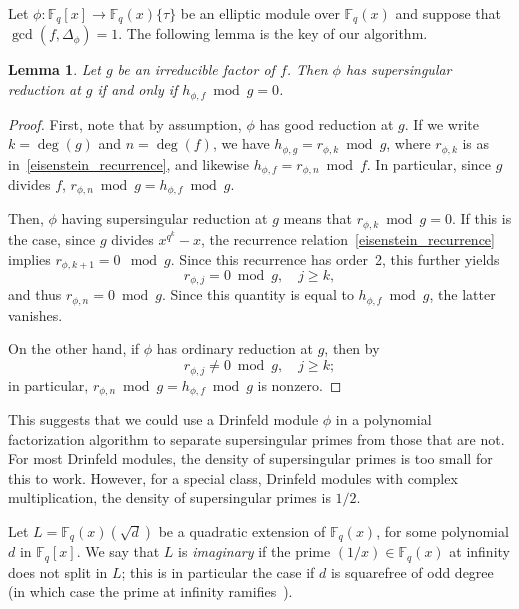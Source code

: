 \documentclass[12pt]{article}
\theoremstyle{plain}
\newtheorem{lemma}[theorem]{Lemma}
\theoremstyle{definition}
\newcommand{\ang}[1]{\{#1\}}
\def\F{\ensuremath{\mathbb{F}}}
\begin{document}
Let $\phi: \F_q[x] \to \F_q(x)\ang{\tau}$ be an elliptic
module over $\F_q(x)$ and suppose that $\gcd(f,\Delta_\phi)=1$. 
 The following lemma is the key of our algorithm.
\begin{lemma}\label{lemma:split}
  Let $g$ be an irreducible factor of $f$. Then $\phi$ has supersingular
  reduction at $g$ if and only if $h_{\phi,f} \bmod g=0$.
\end{lemma}
\begin{proof}
  First, note that by assumption, $\phi$ has good reduction at $g$. If
  we write $k=\deg(g)$ and $n=\deg(f)$, we have $h_{\phi,g}=r_{\phi,k}
  \bmod g$, where $r_{\phi,k}$ is as in~\eqref{eisenstein_recurrence},
  and likewise $h_{\phi,f} = r_{\phi,n} \bmod f$. In particular,
  since $g$ divides $f$, $r_{\phi,n} \bmod g = h_{\phi,f} \bmod g$. 

  Then, $\phi$ having supersingular reduction at $g$ means that
  $r_{\phi,k} \bmod g=0$. If this is the case, since $g$ divides
  $x^{q^k}-x$, the recurrence relation~\eqref{eisenstein_recurrence} implies $r_{\phi,k+1} = 0 \mod
  g$. Since this recurrence has order~2, this further yields
  \begin{equation}\label{supersingular_zero}
    r_{\phi,j} = 0 \bmod g,\quad j \geq k,
  \end{equation}
  and thus $r_{\phi,n}=0 \bmod g$. Since this quantity is equal to
  $h_{\phi,f}\bmod g$, the latter vanishes.

  On the other hand, if $\phi$ has ordinary reduction at $g$, then
  by~\cite[Lemma~2.3]{cor}
  \begin{equation}\label{supersingular_nonzero}
    r_{\phi,j} \neq 0 \bmod g, \quad j \geq k;
  \end{equation}
  in particular, $r_{\phi,n} \bmod g = h_{\phi,f} \bmod g$ is nonzero.
\end{proof}

This suggests that we could use a Drinfeld module $\phi$ in a
polynomial factorization algorithm to separate supersingular primes
from those that are not. For most Drinfeld modules, the density of
supersingular primes is too small for this to work. However, for a
special class, Drinfeld modules with complex multiplication, the
density of supersingular primes is $1/2$.

Let $L=\F_q(x)(\sqrt{d})$ be a quadratic extension of $\F_q(x)$, for
some polynomial $d$ in $\F_q[x]$.  We say that $L$ is {\em imaginary}
if the prime $(1/x) \in \F_q(x)$ at infinity does not split in $L$;
this is in particular the case if $d$ is squarefree of odd degree (in which case the 
prime at infinity ramifies~\cite[Proposition~14.6]{Rosen02}).
\end{document}
